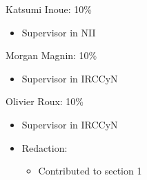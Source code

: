 \noindent
Katsumi Inoue: 10\%
\begin{itemize}
  \item Supervisor in NII
\end{itemize}

\noindent
Morgan Magnin: 10\%
\begin{itemize}
  \item Supervisor in IRCCyN
\end{itemize}

\noindent
Olivier Roux: 10\%
\begin{itemize}
  \item Supervisor in IRCCyN
  \item Redaction:
  \begin{itemize}
    \item Contributed to section 1
  \end{itemize}

\end{itemize}
